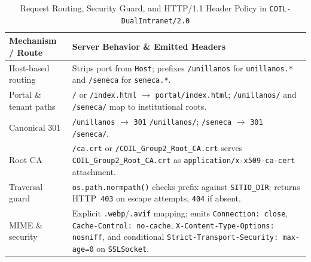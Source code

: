 \begin{table}[t]
\centering
\caption{Request Routing, Security Guard, and HTTP/1.1 Header Policy in \texttt{COIL-DualIntranet/2.0}}
\label{tab:server_routes}
\footnotesize
\setlength{\tabcolsep}{4pt}
\renewcommand{\arraystretch}{1.2}
\begin{tabularx}{\columnwidth}{@{} >{\raggedright\arraybackslash}p{2.95cm} >{\raggedright\arraybackslash}X @{}}
\toprule
\textbf{Mechanism / Route} & \textbf{Server Behavior \& Emitted Headers} \\
\midrule
Host-based routing & Strips port from \texttt{Host}; prefixes \nolinkurl{/unillanos} for \texttt{unillanos.*} and \nolinkurl{/seneca} for \texttt{seneca.*}. \\
\addlinespace[2pt]
Portal \& tenant paths & \nolinkurl{/} or \nolinkurl{/index.html} $\rightarrow$ \nolinkurl{portal/index.html}; \nolinkurl{/unillanos/} and \nolinkurl{/seneca/} map to institutional roots. \\
\addlinespace[2pt]
Canonical 301 & \nolinkurl{/unillanos} $\rightarrow$ \texttt{301} \nolinkurl{/unillanos/}; \nolinkurl{/seneca} $\rightarrow$ \texttt{301} \nolinkurl{/seneca/}. \\
\addlinespace[2pt]
Root CA & \nolinkurl{/ca.crt} or \nolinkurl{/COIL_Group2_Root_CA.crt} serves \nolinkurl{COIL_Group2_Root_CA.crt} as \texttt{application/x-x509-ca-cert} attachment. \\
\addlinespace[2pt]
Traversal guard & \texttt{os.path.normpath()} checks prefix against \texttt{SITIO\_DIR}; returns HTTP~\texttt{403} on escape attempts, \texttt{404} if absent. \\
\addlinespace[2pt]
MIME \& security & Explicit \texttt{.webp}/\texttt{.avif} mapping; emits \texttt{Connection: close}, \texttt{Cache-Control: no-cache}, \texttt{X-Content-Type-Options: nosniff}, and conditional \texttt{Strict-Transport-Security: max-age=0} on \texttt{SSLSocket}. \\
\bottomrule
\end{tabularx}
\end{table}

